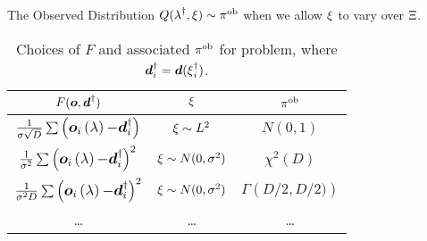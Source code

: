 \begin{block}{The Observed Distribution}
\centering
\Large
    $Q(\operatorname*{\lambda}^\dagger, \operatorname*{\xi}) \sim \operatorname*{\pi^{ob}}$ when we allow $\operatorname*{\xi}$ to vary over $\operatorname*{\Xi}$.
\vspace{1cm}
    \begin{table}
      \centering
      \begin{tabular}{c c c}
        \textbf{$F(\boldsymbol{o}, \boldsymbol{d}^\dagger)$} & \textbf{$\operatorname*{\xi}$} & {$\operatorname*{\pi^{ob}}$} \\
        \midrule
        $\frac{1}{\sigma\sqrt{D}} \large\sum \left( \boldsymbol{o}_i\operatorname*{\left ( \operatorname*{\lambda} \right )} - \boldsymbol{d}_i^\dagger \right)$ & $\operatorname*{\xi} \sim L^2$ & $N(0,1)$ \\
        $\frac{1}{\sigma^2} \large\sum \left ( \boldsymbol{o}_i\operatorname*{\left ( \operatorname*{\lambda} \right )} - \boldsymbol{d}_i^\dagger \right)^2$ & $\operatorname*{\xi} \sim N(0,\sigma^2)$ & $\chi^2 (D)$ \\
        $\frac{1}{\sigma^2 D} \large\sum \left ( \boldsymbol{o}_i\operatorname*{\left ( \operatorname*{\lambda} \right )} - \boldsymbol{d}_i^\dagger \right)^2$ & $\operatorname*{\xi} \sim N(0,\sigma^2)$ & $\Gamma \left ( D/2, D/2) \right )$ \\
        \dots & \dots & \dots \\
        \bottomrule
      \end{tabular}
      \caption{\large Choices of $F$ and associated $\operatorname*{\pi^{ob}}$ for problem, where $\boldsymbol{d}_i^\dagger = \boldsymbol{d}(\operatorname*{\xi}_i^\dagger)$.}
    \end{table}

\end{block}
\vspace{-1cm}
